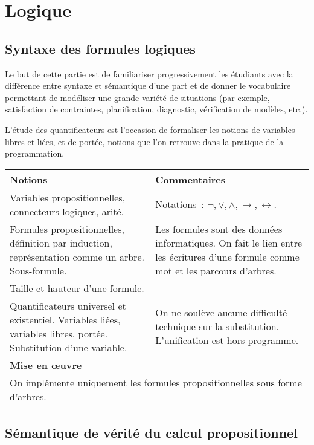 \section{Logique \semDeux \semTroisQuatre}

\subsection{Syntaxe des formules logiques \semDeux}

Le but de cette partie est de familiariser progressivement les étudiants avec
la différence entre syntaxe et sémantique d'une part et de donner le
vocabulaire permettant de modéliser une grande variété de situations (par
exemple, satisfaction de contraintes, planification, diagnostic, vérification
de modèles, etc.).

L'étude des quantificateurs est l'occasion de formaliser les notions de
variables libres et liées, et de portée, notions que l'on retrouve dans 
la pratique de la programmation.

\noindent
\begin{longtable}{|p{\lnotion}|p{\comment}|}
    \hline
    \textbf{Notions} & \textbf{Commentaires} \\
    \hline \hline
    Variables propositionnelles, connecteurs logiques, arité. & 
    Notations~: $\neg, \vee, \wedge, \rightarrow, \leftrightarrow$.
    \\
    Formules propositionnelles, définition par induction, représentation comme un arbre. Sous-formule.
    & Les formules sont des données informatiques. On fait le lien entre les écritures d'une formule comme mot et les parcours d'arbres.
    \\
    Taille et hauteur d'une formule. &
    \\
    \hline 
    Quantificateurs universel et existentiel. Variables liées, variables
    libres, portée. Substitution d'une variable. 
    & On ne soulève aucune difficulté technique sur la substitution.
    L'unification est hors programme.
    \\
    \hline \hline
    \multicolumn{2}{|p{\lmoe}|}{\textbf{Mise en \oe uvre}} \\
    \hline
    \multicolumn{2}{|p{\lmoe}|}{
        On implémente uniquement les formules propositionnelles 
        sous forme d'arbres.
    } \\
    \hline
\end{longtable}


\subsection{Sémantique de vérité du calcul propositionnel \semDeux}

